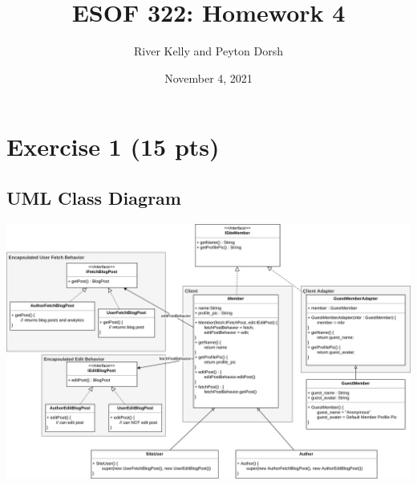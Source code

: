 \documentclass[12pt]{article}
\title{ESOF 322: Homework 4}
\author{River Kelly and Peyton Dorsh}
\date{November 4, 2021}
\begin{document}
\maketitle
\newpage
\section*{Exercise 1 (15 pts)}
\subsection*{UML Class Diagram}
\includegraphics[width=\linewidth]{UML-Class-Diagram.png}
\end{document}
